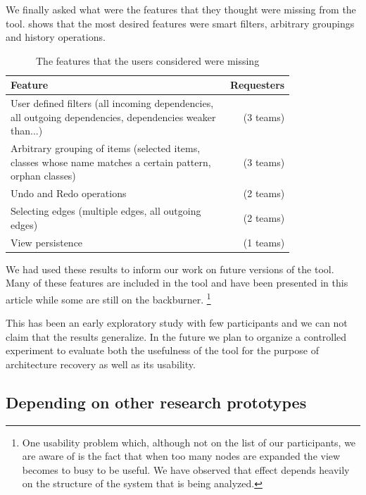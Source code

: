 \documentclass[preprint,12pt]{elsarticle}
\begin{document}
We finally asked what were the features that they thought were missing from the tool.  shows that the most desired features were smart filters, arbitrary groupings and history operations.

\begin{table}[ht]
\begin{center}
\begin{tabular}{p{0.8\linewidth} r}
\footnotesize {Feature} &\footnotesize{ Requesters} \\
\hline
\footnotesize {User defined filters (all incoming dependencies, all outgoing dependencies, dependencies weaker than...)} &\footnotesize{ (3 teams)} \\
\footnotesize {Arbitrary grouping of items (selected items, classes whose name matches a certain pattern, orphan classes)} &\footnotesize{ (3 teams)} \\
\footnotesize {Undo and Redo operations} &\footnotesize{ (2 teams)} \\
\footnotesize {Selecting edges (multiple edges, all outgoing edges)} &\footnotesize{ (2 teams)} \\
\footnotesize {View persistence} &\footnotesize{ (1 teams)} \\
\hline

\end{tabular}
\caption{The features that the users considered were missing}
\label{tab:missing}
\end{center}
\end{table}

We had used these results to inform our work on future versions of the tool. Many of these features are included in the tool and have been presented in this article while some are still on the backburner. \footnote{One usability problem which, although not on the list of our participants, we are aware of is the fact that when too many nodes are expanded the view becomes to busy to be useful. We have observed that effect depends heavily on the structure of the system that is being analyzed. }


This has been an early exploratory study with few participants and we can not claim that the results generalize. In the future we plan to organize a controlled experiment to evaluate both the usefulness of the tool for the purpose of architecture recovery as well as its usability.

\subsection {Depending on other research prototypes }
\end{document}
